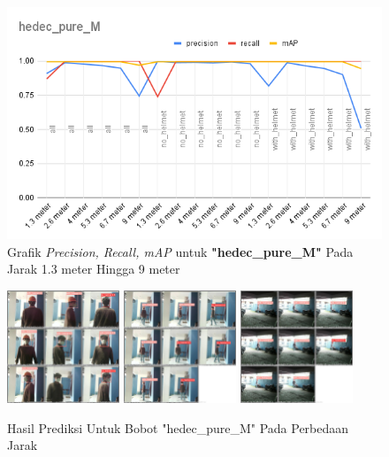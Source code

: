 \begin{enumerate}
  \begin{figure} [h!]
    \centering
    \includegraphics[width=1\textwidth]{gambar/BerdasarkanJarak/hedec_pure_M.png}
    \caption{Grafik \emph{Precision, Recall, mAP} untuk \textbf{"hedec\_pure\_M"} Pada Jarak 1.3 meter Hingga 9 meter}
    \label{fig:grafvaljarak_hedec_pure_M}  
  \end{figure}

  \begin{figure} [h!]
    \centering
    \includegraphics[width=0.3\textwidth]{gambar/BerdasarkanJarak_v2/val_hedec_pure_M/Jarak1_3/val_batch0_pred.jpg}
    \includegraphics[width=0.3\textwidth]{gambar/BerdasarkanJarak_v2/val_hedec_pure_M/Jarak5_3/val_batch0_pred.jpg}
    \includegraphics[width=0.3\textwidth]{gambar/BerdasarkanJarak_v2/val_hedec_pure_M/Jarak9/val_batch0_pred.jpg}
    \caption{Hasil Prediksi Untuk Bobot "hedec\_pure\_M" Pada Perbedaan Jarak}
    \label{fig:valjarak_sample_hedec_pure_M}  
  \end{figure}


\end{enumerate}

